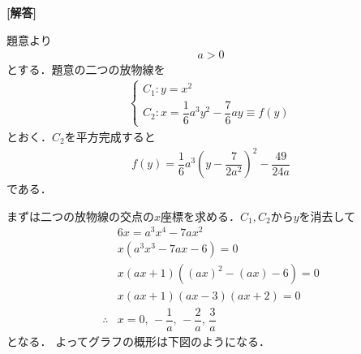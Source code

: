 \documentclass[../../main.tex]{subfiles}
\begin{document}
\begin{oframed}
  
\end{oframed}

{\bf [解答]}

題意より
\begin{align}
  a > 0 \label{eq:1}
\end{align}
とする．題意の二つの放物線を
\begin{align}
  \begin{cases}
    C_1 : y = x^2 \\
    C_2 : x = \dfrac{1}{6}a^3 y^2 - \dfrac{7}{6}ay \equiv f(y)
  \end{cases}
\end{align}
とおく．$C_2$を平方完成すると
\begin{align}
  f(y) = \dfrac{1}{6}a^3 \left( y - \dfrac{7}{2a^2} \right)^2 - \dfrac{49}{24a}
\end{align}
である．

まずは二つの放物線の交点の$x$座標を求める．$C_1, C_2$から$y$を消去して
\begin{align}
  & 6x = a^3 x^4 - 7ax^2 \\
  & x(a^3 x^3 - 7ax - 6) = 0 \\
  & x(ax + 1)((ax)^2 - (ax) - 6) = 0 \\
  & x(ax + 1)(ax - 3)(ax + 2) = 0 \\
  \therefore
  & x = 0, \, -\dfrac{1}{a}, \, -\dfrac{2}{a}, \, \dfrac{3}{a}
\end{align}
となる．
よってグラフの概形は下図のようになる．
\end{document}
